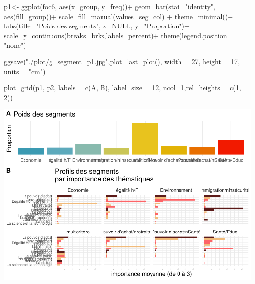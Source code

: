 \documentclass[
]{book}
\newenvironment{Shaded}{\begin{snugshade}}{\end{snugshade}}
\newcommand{\AttributeTok}[1]{\textcolor[rgb]{0.77,0.63,0.00}{#1}}
\newcommand{\ConstantTok}[1]{\textcolor[rgb]{0.00,0.00,0.00}{#1}}
\newcommand{\DecValTok}[1]{\textcolor[rgb]{0.00,0.00,0.81}{#1}}
\newcommand{\FunctionTok}[1]{\textcolor[rgb]{0.00,0.00,0.00}{#1}}
\newcommand{\NormalTok}[1]{#1}
\newcommand{\OtherTok}[1]{\textcolor[rgb]{0.56,0.35,0.01}{#1}}
\newcommand{\SpecialCharTok}[1]{\textcolor[rgb]{0.00,0.00,0.00}{#1}}
\newcommand{\StringTok}[1]{\textcolor[rgb]{0.31,0.60,0.02}{#1}}
\begin{document}
\begin{Shaded}
\begin{Highlighting}[]
\NormalTok{p1}\OtherTok{\textless{}{-}} \FunctionTok{ggplot}\NormalTok{(foo6, }\FunctionTok{aes}\NormalTok{(}\AttributeTok{x=}\NormalTok{group, }\AttributeTok{y=}\NormalTok{freq))}\SpecialCharTok{+}
  \FunctionTok{geom\_bar}\NormalTok{(}\AttributeTok{stat=}\StringTok{"identity"}\NormalTok{, }\FunctionTok{aes}\NormalTok{(}\AttributeTok{fill=}\NormalTok{group))}\SpecialCharTok{+}
  \FunctionTok{scale\_fill\_manual}\NormalTok{(}\AttributeTok{values=}\NormalTok{seg\_col) }\SpecialCharTok{+} 
  \FunctionTok{theme\_minimal}\NormalTok{()}\SpecialCharTok{+} 
  \FunctionTok{labs}\NormalTok{(}\AttributeTok{title=}\StringTok{"Poids des segments"}\NormalTok{, }\AttributeTok{x=}\ConstantTok{NULL}\NormalTok{, }\AttributeTok{y=}\StringTok{"Proportion"}\NormalTok{)}\SpecialCharTok{+}  
  \FunctionTok{scale\_y\_continuous}\NormalTok{(}\AttributeTok{breaks=}\NormalTok{brks,}\AttributeTok{labels=}\NormalTok{percent)}\SpecialCharTok{+}  
  \FunctionTok{theme}\NormalTok{(}\AttributeTok{legend.position =} \StringTok{"none"}\NormalTok{)}

\FunctionTok{ggsave}\NormalTok{(}\StringTok{"./plot/g\_segment\_p1.jpg"}\NormalTok{,}\AttributeTok{plot=}\FunctionTok{last\_plot}\NormalTok{(), }\AttributeTok{width =} \DecValTok{27}\NormalTok{, }\AttributeTok{height =} \DecValTok{17}\NormalTok{, }\AttributeTok{units =} \StringTok{"cm"}\NormalTok{)}

\FunctionTok{plot\_grid}\NormalTok{(p1, p2, }\AttributeTok{labels =} \FunctionTok{c}\NormalTok{(}\StringTok{\textquotesingle{}A\textquotesingle{}}\NormalTok{, }\StringTok{\textquotesingle{}B\textquotesingle{}}\NormalTok{), }\AttributeTok{label\_size =} \DecValTok{12}\NormalTok{, }\AttributeTok{ncol=}\DecValTok{1}\NormalTok{,}\AttributeTok{rel\_heights =}  \FunctionTok{c}\NormalTok{(}\DecValTok{1}\NormalTok{, }\DecValTok{2}\NormalTok{))}
\end{Highlighting}
\end{Shaded}

\includegraphics{bookdown-demo_files/figure-latex/0815-2.pdf}
\end{document}
